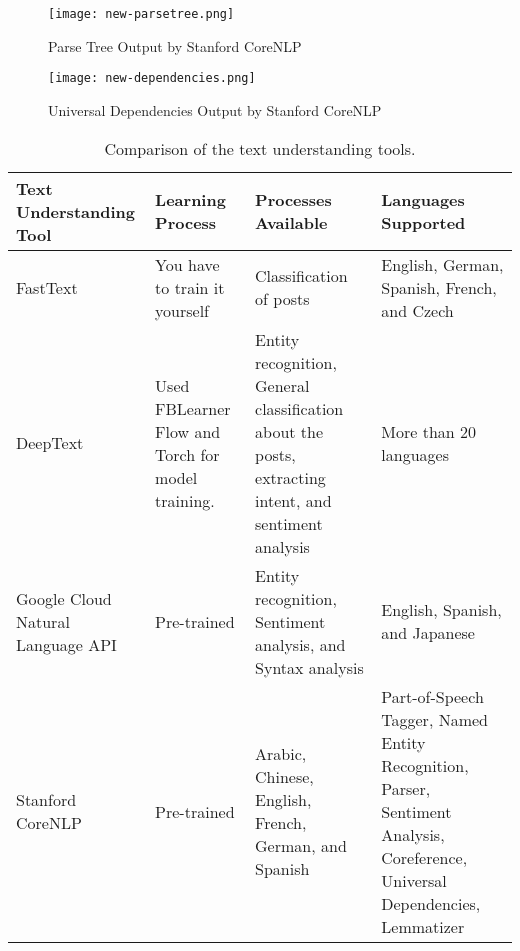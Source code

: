 \begin{figure}[!htb]                %
	\centering                    %
	\texttt{[image: new-parsetree.png]}      %
	\caption{Parse Tree Output by Stanford CoreNLP} 
	\label{fig:new-parsetree}
\end{figure}

\begin{figure}[!htb]                %
	\centering                    %
	\texttt{[image: new-dependencies.png]}      %
	\caption{Universal Dependencies Output by Stanford CoreNLP} 
	\label{fig:new-dependencies}
\end{figure}

\clearpage
\begin{table}[ph!]   %
\centering
\caption{Comparison of the text understanding tools.} \vspace{0.25em}
\begin{tabular}{|p{1in}|p{1.5in}|p{1.5in}|p{1in}|} \hline
\centering Text Understanding Tool & Learning Process & Processes Available & Languages Supported \\ \hline
FastText & You have to train it yourself & Classification of posts & English, German, Spanish, French, and Czech \\ \hline
DeepText & Used FBLearner Flow and Torch for model training. & Entity recognition, General classification about the posts, extracting intent, and sentiment analysis & More than 20 languages \\ \hline
Google Cloud Natural Language API & Pre-trained & Entity recognition, Sentiment analysis, and Syntax analysis & English, Spanish, and Japanese \\ \hline
Stanford CoreNLP & Pre-trained & Arabic, Chinese, English, French, German, and Spanish & Part-of-Speech Tagger, Named Entity Recognition, Parser, Sentiment Analysis, Coreference, Universal Dependencies, Lemmatizer \\ \hline
\end{tabular}
\label{tab:TextUnderstandingTool}
\end{table}


